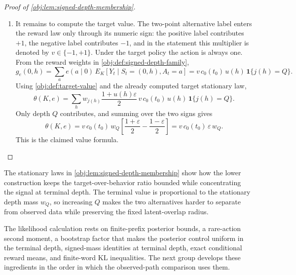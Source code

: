 \documentclass[11pt]{article}
\begin{document}
\begin{proof}[Proof of \cref{obj:lem:signed-depth-membership}]
\begin{enumerate}
\item It remains to compute the target value.  The two-point alternative label
enters the reward law only through its numeric sign: the positive label
contributes \(+1\), the negative label contributes \(-1\), and in the statement
this multiplier is denoted by \(v\in\{-1,+1\}\).  Under the target policy the
action is always one.  From the reward weights in
\cref{obj:def:signed-depth-family},
\[
g_e(0,h)
=
\sum_a e(a\mid0)\,E_K[Y_t\mid S_t=(0,h),A_t=a]
=
v\,c_0(t_0)\,u(h)\,\mathbf 1\{j(h)=Q\}.
\]
Using \cref{obj:def:target-value} and the already computed target stationary
law,
\[
\theta(K,e)
=
\sum_h
w_{j(h)}
\frac{1+u(h)\varepsilon}{2}\,
v\,c_0(t_0)\,u(h)\,\mathbf 1\{j(h)=Q\}.
\]
Only depth \(Q\) contributes, and summing over the two signs gives
\[
\theta(K,e)
=
v\,c_0(t_0)\,w_Q
\left[
\frac{1+\varepsilon}{2}
-
\frac{1-\varepsilon}{2}
\right]
=
v\,c_0(t_0)\,\varepsilon\,w_Q .
\]
This is the claimed value formula. %
\end{enumerate}
\end{proof}

The stationary laws in \cref{obj:lem:signed-depth-membership} show how the lower construction keeps the target-over-behavior ratio bounded while concentrating the signal at terminal depth. The terminal value is proportional to the stationary depth mass \(w_Q\), so increasing \(Q\) makes the two alternatives harder to separate from observed data while preserving the fixed latent-overlap radius.

The likelihood calculation rests on finite-prefix posterior bounds, a rare-action second moment, a bootstrap factor that makes the posterior control uniform in the terminal depth, signed-mass identities at terminal depth, exact conditional reward means, and finite-word KL inequalities. The next group develops these ingredients in the order in which the observed-path comparison uses them.
\end{document}
